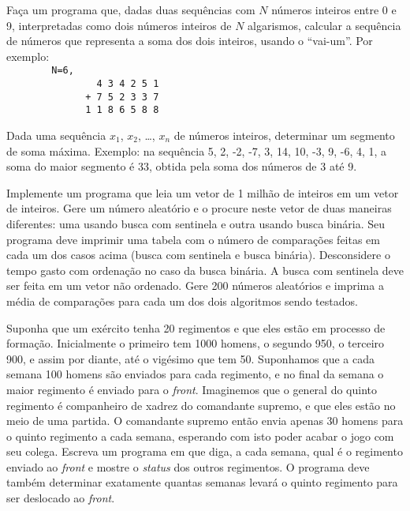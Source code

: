 \item Faça um programa que, 
dadas duas sequências com
$N$ números inteiros entre 0 e 9, interpretadas como dois números
inteiros de $N$ algarismos, calcular a sequência de números que
representa a soma dos dois inteiros, usando o ``vai-um''. Por exemplo:\\

\verb|        N=6,|\\
\verb|                4 3 4 2 5 1|\\
\verb|              + 7 5 2 3 3 7|\\
\verb|              1 1 8 6 5 8 8|



\item Dada  uma  sequência  $x_1$,  $x_2$, \ldots,  $x_n$  de  
números  inteiros,
determinar um segmento de soma  máxima.  Exemplo: na sequência 5, 2, -2,
-7, 3, 14,  10, -3, 9, -6, 4,  1, a soma do maior segmento  é 33, obtida
pela soma dos números de 3 até 9. 
 
\item Implemente um programa que leia um vetor de 1 milhão de inteiros
   em um vetor de inteiros. Gere um número aleatório e o procure
   neste vetor de duas maneiras diferentes: uma usando busca com 
   sentinela e outra usando busca binária. Seu programa deve imprimir
   uma tabela com o número de comparações feitas em cada um dos casos
   acima (busca com sentinela e busca binária). Desconsidere o tempo
   gasto com ordenação no caso da busca binária. A busca com sentinela
   deve ser feita em um vetor não ordenado. Gere 200 números aleatórios
   e imprima a média de comparações para cada um dos dois algoritmos
   sendo testados.

\item 
Suponha que um ex\'ercito tenha 20 regimentos e que eles est\~ao em processo
de forma\c c\~ao. Inicialmente o primeiro tem 1000 homens, o segundo 950,
o terceiro 900, e assim por diante, at\'e o vig\'esimo que tem 50. Suponhamos
que a cada semana 100 homens s\~ao enviados para cada regimento, e no final
da semana o maior regimento \'e enviado para o {\em front}. Imaginemos que o
general do quinto regimento \'e companheiro de xadrez do comandante supremo,
e que eles est\~ao no meio de uma partida. O comandante supremo ent\~ao
envia apenas 30 homens para o quinto regimento a cada semana, esperando com
isto poder acabar o jogo com seu colega.
Escreva um programa em 
que diga, a cada semana, qual \'e o regimento enviado ao {\em front} e mostre o {\em status} dos outros regimentos. O programa
deve tamb\'em determinar exatamente quantas semanas levar\'a o quinto regimento
para ser deslocado ao {\em front}. 

